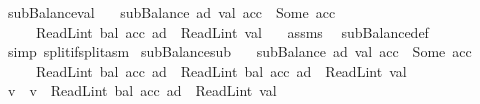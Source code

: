 \begin{isabellebody}
\endisatagproof
{\isafoldproof}%
%
\isadelimproof
\isanewline
%
\endisadelimproof
\isanewline
{}\isamarkupfalse%
\ subBalance{\isacharunderscore}{\kern0pt}val{}{\isacharcolon}{\kern0pt}\isanewline
\ \ \ {\isachardoublequoteopen}subBalance\ ad\ val\ acc\ {\isacharequal}{\kern0pt}\ Some\ acc{\isacharprime}{\kern0pt}{\isachardoublequoteclose}\isanewline
\ \ \ \ \ {\isachardoublequoteopen}ReadL\isactrlsub i\isactrlsub n\isactrlsub t\ {\isacharparenleft}{\kern0pt}bal\ {\isacharparenleft}{\kern0pt}acc\ ad{\isacharparenright}{\kern0pt}{\isacharparenright}{\kern0pt}\ {\isacharminus}{\kern0pt}\ ReadL\isactrlsub i\isactrlsub n\isactrlsub t\ val\ {\isasymge}\ {}{\isachardoublequoteclose}\isanewline
%
\isadelimproof
%
\endisadelimproof
%
\isatagproof
{}\isamarkupfalse%
\ assms\ \isamarkupfalse%
\ subBalance{\isacharunderscore}{\kern0pt}def\ \isamarkupfalse%
\ {\isacharparenleft}{\kern0pt}simp\ split{\isacharcolon}{\kern0pt}if{\isacharunderscore}{\kern0pt}split{\isacharunderscore}{\kern0pt}asm{\isacharparenright}{\kern0pt}%
\endisatagproof
{\isafoldproof}%
%
\isadelimproof
\isanewline
%
\endisadelimproof
\isanewline
{}\isamarkupfalse%
\ subBalance{\isacharunderscore}{\kern0pt}sub{\isacharcolon}{\kern0pt}\isanewline
\ \ \ {\isachardoublequoteopen}subBalance\ ad\ val\ acc\ {\isacharequal}{\kern0pt}\ Some\ acc{\isacharprime}{\kern0pt}{\isachardoublequoteclose}\isanewline
\ \ \ \ \ {\isachardoublequoteopen}ReadL\isactrlsub i\isactrlsub n\isactrlsub t\ {\isacharparenleft}{\kern0pt}bal\ {\isacharparenleft}{\kern0pt}acc{\isacharprime}{\kern0pt}\ ad{\isacharparenright}{\kern0pt}{\isacharparenright}{\kern0pt}\ {\isacharequal}{\kern0pt}\ ReadL\isactrlsub i\isactrlsub n\isactrlsub t\ {\isacharparenleft}{\kern0pt}bal\ {\isacharparenleft}{\kern0pt}acc\ ad{\isacharparenright}{\kern0pt}{\isacharparenright}{\kern0pt}\ {\isacharminus}{\kern0pt}\ ReadL\isactrlsub i\isactrlsub n\isactrlsub t\ val{\isachardoublequoteclose}\isanewline
%
\isadelimproof
%
\endisadelimproof
%
\isatagproof
{}\isamarkupfalse%
\ {\isacharminus}{\kern0pt}\isanewline
\ \ \isamarkupfalse%
\ v\ \ {\isachardoublequoteopen}v\ {\isacharequal}{\kern0pt}\ ReadL\isactrlsub i\isactrlsub n\isactrlsub t\ {\isacharparenleft}{\kern0pt}bal\ {\isacharparenleft}{\kern0pt}acc\ ad{\isacharparenright}{\kern0pt}{\isacharparenright}{\kern0pt}\ {\isacharminus}{\kern0pt}\ ReadL\isactrlsub i\isactrlsub n\isactrlsub t\ val{\isachardoublequoteclose}\isanewline

\end{isabellebody}
